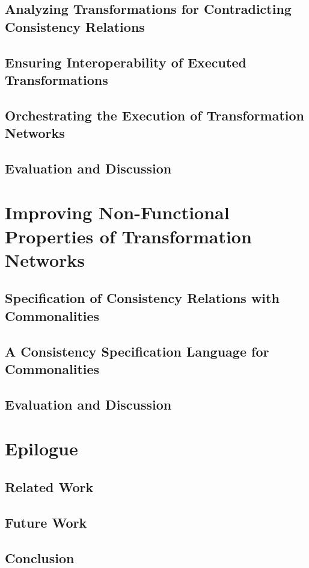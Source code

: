 \documentclass{sdqdiss-24x17-ksp} %
\begin{document}
\chapter{Analyzing Transformations for Contradicting Consistency Relations}
\chapter{Ensuring Interoperability of Executed Transformations}
\chapter{Orchestrating the Execution of Transformation Networks}
\chapter{Evaluation and Discussion}

\part{Improving Non-Functional Properties of Transformation Networks}
\chapter{Specification of Consistency Relations with Commonalities}
\chapter{A Consistency Specification Language for Commonalities}
\chapter{Evaluation and Discussion}

\part{Epilogue}
\chapter{Related Work}
\chapter{Future Work}
\chapter{Conclusion}
\end{document}

